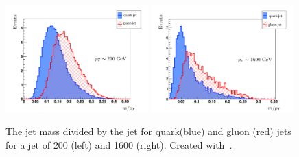 \begin{figure}[ht!]
\centering
\includegraphics[width=0.49\textwidth]{figures/analysis/search2/misc/ak07_MDPt_0200.pdf}
\includegraphics[width=0.49\textwidth]{figures/analysis/search2/misc/ak07_MDPt_1600.pdf}
\caption{The jet mass divided by the jet \PT for quark(blue) and gluon (red) jets for a jet \PT of 200 (left) and 1600 \GeV (right). Created with~\cite{Gallicchio:2011xq}.}
\label{fig:searchII:mpt_qvsg}
\end{figure}
\clearpage

